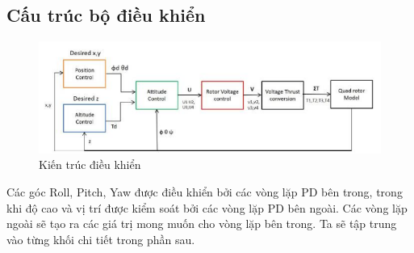 			\subsection{Cấu trúc bộ điều khiển}
			\begin{figure}[h!]
	        	\begin{center}
	        		\includegraphics[scale=0.8]{images/Cuong-ControlArchitecture.png}
	        		\caption{Kiến trúc điều khiển}
	        	\end{center}
        \end{figure}
        	Các góc Roll, Pitch, Yaw được điều khiển bởi các vòng lặp PD bên trong, trong khi độ cao và vị trí được kiểm soát bởi các vòng lặp PD bên ngoài. Các vòng lặp ngoài sẽ tạo ra các giá trị mong muốn cho vòng lặp bên trong. Ta sẽ tập trung vào từng khối chi tiết trong phần sau.
\\
